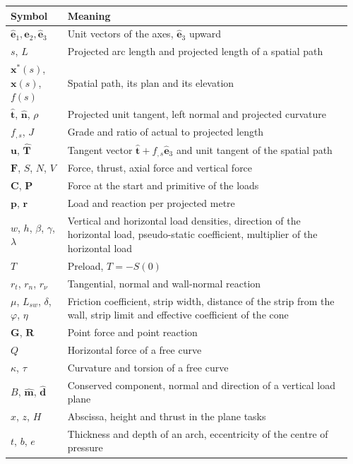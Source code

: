 \documentclass[fontsize=10.5pt,paper=a4,parskip=half,headings=normal,numbers=noenddot,
  open=any,bibliography=totoc,captions=tableheading]{scrreprt}
\numberwithin{figure}{chapter}
\numberwithin{table}{chapter}
\newcommand{\e}{\hat{\mathbf e}}
\newcommand{\x}{\mathbf x}
\newcommand{\F}{\mathbf F}
\newcommand{\G}{\mathbf G}
\newcommand{\R}{\mathbf R}
\newcommand{\C}{\mathbf C}
\newcommand{\Pv}{\mathbf P}
\newcommand{\T}{\hat{\mathbf T}}
\newcommand{\tv}{\hat{\mathbf t}}
\newcommand{\nv}{\hat{\mathbf n}}
\newcommand{\uv}{\mathbf u}
\newcommand{\pp}{\mathbf p}
\newcommand{\rr}{\mathbf r}
\newcommand{\dv}{\hat{\mathbf d}}
\newcommand{\mv}{\hat{\mathbf m}}
\begin{document}
{\small
\begin{longtable}{@{}>{\raggedright\arraybackslash}p{0.16\linewidth}>{\raggedright\arraybackslash}p{0.8\linewidth}@{}}
\toprule
\bfseries Symbol & \bfseries Meaning\\ \midrule
\endhead
$\e_1,\e_2,\e_3$ & Unit vectors of the axes, $\e_3$ upward\\
$s$, $L$ & Projected arc length and projected length of a spatial path\\
$\x^*(s)$, $\x(s)$, $f(s)$ & Spatial path, its plan and its elevation\\
$\tv$, $\nv$, $\rho$ & Projected unit tangent, left normal and projected curvature\\
$f_{,s}$, $J$ & Grade and ratio of actual to projected length\\
$\uv$, $\T$ & Tangent vector $\tv+f_{,s}\e_3$ and unit tangent of the spatial path\\
$\F$, $S$, $N$, $V$ & Force, thrust, axial force and vertical force\\
$\C$, $\Pv$ & Force at the start and primitive of the loads\\
$\pp$, $\rr$ & Load and reaction per projected metre\\
$w$, $h$, $\beta$, $\gamma$, $\lambda$ & Vertical and horizontal load densities, direction of the
horizontal load, pseudo-static coefficient, multiplier of the horizontal load\\
$T$ & Preload, $T=-S(0)$\\
$r_t$, $r_n$, $r_\nu$ & Tangential, normal and wall-normal reaction\\
$\mu$, $L_{sw}$, $\delta$, $\varphi$, $\eta$ & Friction coefficient, strip width, distance of the strip
from the wall, strip limit and effective coefficient of the cone\\
$\G$, $\R$ & Point force and point reaction\\
$Q$ & Horizontal force of a free curve\\
$\kappa$, $\tau$ & Curvature and torsion of a free curve\\
$B$, $\mv$, $\dv$ & Conserved component, normal and direction of a vertical load plane\\
$x$, $z$, $H$ & Abscissa, height and thrust in the plane tasks\\
$t$, $b$, $e$ & Thickness and depth of an arch, eccentricity of the centre of pressure\\
\bottomrule
\end{longtable}}
\end{document}
